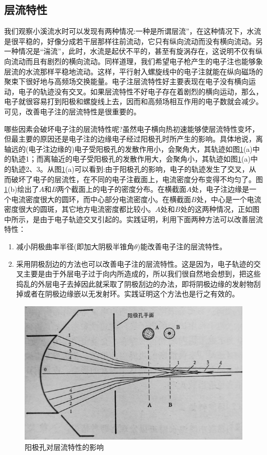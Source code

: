 \subsection{层流特性}

我们观察小溪流水时可以发现有两种情况:一种是所谓层流”，在这种情况下，水流是很平稳的，好像分成若干层那样往前流动，它只有纵向流动而没有横向流动。另一种情况是“湍流”，此时，水流是起伏不平的，甚至有旋涡存在，这说明不仅有纵向流动而且有剧烈的横向流动。同样道理，我们希望电子枪产生的电子注也能够象层流的水流那样平稳地流动。这样，平行射入螺旋线中的电子注就能在纵向磁场的聚束下很好地与高频场交换能量。电子注层流特性好主要表现在电子没有横向运动，电子的轨迹没有交叉。如果层流特性不好电子存在着剧烈的横向运动，那么，电子就很容易打到阳极和螺旋线上去，因而和高频场相互作用的电子数就会减少。可见，改善电子注的层流特性是很重要的。

哪些因素会破坏电子注的层流特性呢?虽然电子横向热初速能够使层流特性变坏，但最主要的原因还是电子注的边缘电子经过阳极孔时所产生的影响。具体地说，离轴远的(电子注边缘的)电子受阳极孔的发散作用小，会聚角大，其轨迹如图\ref{ch6-8}(a)中的轨迹1；而离轴近的电子受阳极孔的发散作用大，会聚角小，其轨迹如图\ref{ch6-8}(a)中的轨迹2、3。从图\ref{ch6-8}(a)可以看到:由于阳极孔的影响，电子的轨迹发生了交叉，从而破坏了电子的层流性，在不同的电子注截面上，电流密度分布变得不均匀了。图\ref{ch6-8}(b)绘出了$ A $和$ B $两个截面上的电子的密度分布。在横截面$ A $处，电子注边缘是一个电流密度很大的圆环，而中心部分电流密度小。在横截面$ B $处，中心是一个电流密度很大的圆斑，其它地方电流密度都比较小。$ A $处和$ B $处的这两种情况，正如图中所示，是由于电子轨迹交叉引起的。实践证明，利用下面两种方法可以改善层流特性：

\begin{enumerate}
	\item 减小阴极曲率半径(即加大阴极半锥角$ \theta $)能改善电子注的层流特性。
	\item 采用阴极刮边的方法也可以改善电子注的层流特性。这是因为，电子轨迹的交叉主要是由于外层电子过于向内所造成的，所以我们很自然地会想到，把这些捣乱的外层电子去掉因此就采取了阴极刮边的办法，即将阴极边缘的发射物刮掉或者在阴极边缘嵌以无发射环。实践证明这个方法也是行之有效的。
\end{enumerate}


\begin{figure}[phtb]
	\centering
	\includegraphics[width=0.75\linewidth]{figure/ch6-8}
	\caption{阳极孔对层流特性的影响}
	\label{ch6-8}
\end{figure}